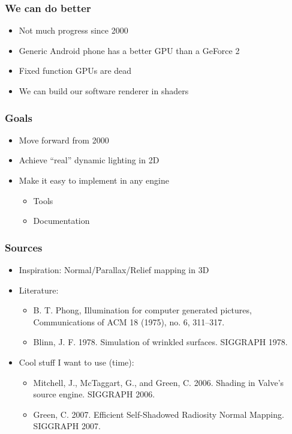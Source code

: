 \documentclass{beamer}
\begin{document}
\begin{frame}\frametitle{We can do better}

\begin{itemize}
\item
  Not much progress since 2000
\item
  Generic Android phone has a better GPU than a GeForce 2
\item
  Fixed function GPUs are dead
\item
  We can build our software renderer in shaders
\end{itemize}

\end{frame}

\begin{frame}\frametitle{Goals}

\begin{itemize}
\item
  Move forward from 2000
\item
  Achieve ``real'' dynamic lighting in 2D
\item
  Make it easy to implement in any engine

  \begin{itemize}
  \item
    Tools
  \item
    Documentation
  \end{itemize}
\end{itemize}

\end{frame}

\begin{frame}\frametitle{Sources}

\begin{itemize}
\item
  Inspiration: Normal/Parallax/Relief mapping in 3D
\item
  Literature:

  \begin{itemize}
  \item
    B. T. Phong, Illumination for computer generated pictures,
    Communications of ACM 18 (1975), no. 6, 311--317.
  \item
    Blinn, J. F. 1978. Simulation of wrinkled surfaces. SIGGRAPH 1978.
  \end{itemize}
\item
  Cool stuff I want to use (time):

  \begin{itemize}
  \item
    Mitchell, J., McTaggart, G., and Green, C. 2006. Shading in Valve's
    source engine. SIGGRAPH 2006.
  \item
    Green, C. 2007. Efficient Self-Shadowed Radiosity Normal Mapping.
    SIGGRAPH 2007.
  \end{itemize}
\end{itemize}

\end{frame}
\end{document}
